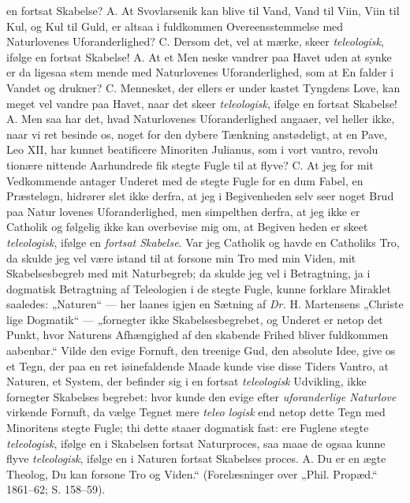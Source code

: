 \documentclass[12pt,a4paper]{article}
\newcommand{\opage}[1]{\marginnote{\footnotesize\textit{[#1]}}}
\begin{document}
en fortsat Skabelse? A. At Svovlarsenik kan blive til
Vand, Vand til Viin, Viin til Kul, og Kul til Guld, er
altsaa i fuldkommen Overeensstemmelse med Naturlovenes
Uforanderlighed? C. Dersom det, vel at mærke, skeer
\emph{teleologisk}, ifølge en fortsat Skabelse! A. At et Men\-%
\opage{5}\setcounter{footnote}{0}%
neske vandrer paa Havet uden at synke er da ligesaa stem\-%
mende med Naturlovenes Uforanderlighed, som at En falder
i Vandet og drukner? C. Mennesket, der ellers er under\-%
kastet Tyngdens Love, kan meget vel vandre paa Havet, naar
det skeer \emph{teleologisk}, ifølge en fortsat Skabelse! A. Men
saa har det, hvad Naturlovenes Uforanderlighed angaaer, vel
heller ikke, naar vi ret besinde os, noget for den dybere
Tænkning anstødeligt, at en Pave, Leo XII, har kunnet
beatificere Minoriten Julianus, som i vort vantro, revolu\-%
tionære nittende Aarhundrede fik stegte Fugle til at flyve?
C. At jeg for mit Vedkommende antager Underet med de stegte
Fugle for en dum Fabel, en Præsteløgn, hidrører slet ikke
derfra, at jeg i Begivenheden selv seer noget Brud paa Natur\-%
lovenes Uforanderlighed, men simpelthen derfra, at jeg ikke er
Catholik og følgelig ikke kan overbevise mig om, at Begiven\-%
heden er skeet \emph{teleologisk}, ifølge en \emph{fortsat Skabelse}.
Var jeg Catholik og havde en Catholiks Tro, da skulde jeg
vel være istand til at forsone min Tro med min Viden, mit
Skabelsesbegreb med mit Naturbegreb; da skulde jeg vel i
Betragtning, ja i dogmatisk Betragtning af Teleologien i de
stegte Fugle, kunne forklare Miraklet saaledes: „Naturen“ ---
her laanes igjen en Sætning af \textit{Dr.} H. Martensens „Christe\-%
lige Dogmatik“ --- „fornegter ikke Skabelsesbegrebet, og
Underet er netop det Punkt, hvor Naturens Afhængighed af
den skabende Frihed bliver fuldkommen aabenbar.“ Vilde den
evige Fornuft, den treenige Gud, den absolute Idee, give os
et Tegn, der paa en ret iøinefaldende Maade kunde vise disse
Tiders Vantro, at Naturen, et System, der befinder sig i en
fortsat \emph{teleologisk} Udvikling, ikke fornegter Skabelses\-%
begrebet: hvor kunde den evige efter \emph{uforanderlige
Naturlove} virkende Fornuft, da vælge Tegnet mere \emph{teleo\-%
logisk} end netop dette Tegn med Minoritens stegte Fugle;
thi dette staaer dogmatisk fast: ere Fuglene stegte \emph{teleologisk},
ifølge en i Skabelsen fortsat Naturproces, saa maae de ogsaa
kunne flyve \emph{teleologisk}, ifølge en i Naturen fortsat Skabelses\-%
proces. A. Du er en ægte Theolog, Du kan forsone Tro
\opage{6}\setcounter{footnote}{0}%
og Viden.“ (Forelæsninger over „Phil. Propæd.“ 1861--62;
S. 158--59).
\end{document}
